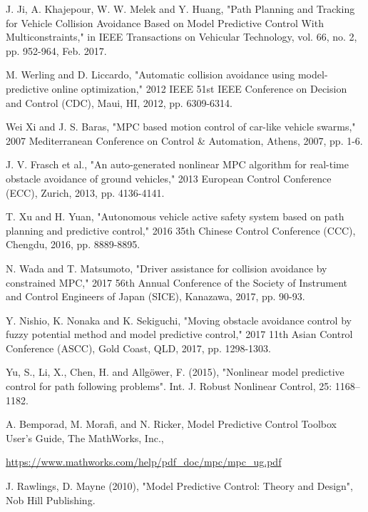 \documentclass[conference, 11pt]{IEEEtran}
\begin{document}
\begin{thebibliography}{00}
	J. Ji, A. Khajepour, W. W. Melek and Y. Huang, "Path Planning and Tracking for Vehicle Collision Avoidance Based on Model Predictive Control With Multiconstraints," in IEEE Transactions on Vehicular Technology, vol. 66, no. 2, pp. 952-964, Feb. 2017.
	
	M. Werling and D. Liccardo, "Automatic collision avoidance using model-predictive online optimization," 2012 IEEE 51st IEEE Conference on Decision and Control (CDC), Maui, HI, 2012, pp. 6309-6314.
	
	Wei Xi and J. S. Baras, "MPC based motion control of car-like vehicle swarms," 2007 Mediterranean Conference on Control \& Automation, Athens, 2007, pp. 1-6.
	
	J. V. Frasch et al., "An auto-generated nonlinear MPC algorithm for real-time obstacle avoidance of ground vehicles," 2013 European Control Conference (ECC), Zurich, 2013, pp. 4136-4141.
	
	T. Xu and H. Yuan, "Autonomous vehicle active safety system based on path planning and predictive control," 2016 35th Chinese Control Conference (CCC), Chengdu, 2016, pp. 8889-8895.
	
	N. Wada and T. Matsumoto, "Driver assistance for collision avoidance by constrained MPC," 2017 56th Annual Conference of the Society of Instrument and Control Engineers of Japan (SICE), Kanazawa, 2017, pp. 90-93.
	
	Y. Nishio, K. Nonaka and K. Sekiguchi, "Moving obstacle avoidance control by fuzzy potential method and model predictive control," 2017 11th Asian Control Conference (ASCC), Gold Coast, QLD, 2017, pp. 1298-1303.
	
	Yu, S., Li, X., Chen, H. and Allgöwer, F. (2015), "Nonlinear model predictive control for path following problems". Int. J. Robust Nonlinear Control, 25: 1168–1182. 
	
	A. Bemporad, M. Morafi, and N. Ricker, Model Predictive Control Toolbox User’s Guide, The MathWorks, Inc.,
	
		\url{https://www.mathworks.com/help/pdf_doc/mpc/mpc_ug.pdf}
		
	J. Rawlings, D. Mayne (2010), "Model Predictive Control: Theory and Design", Nob Hill Publishing.	
\end{thebibliography}
\end{document}
